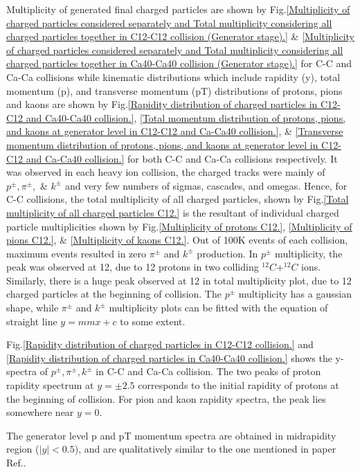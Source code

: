\documentclass[12pt, twocolumn]{article}
\begin{document}
Multiplicity of generated final charged particles are shown by Fig.\ref{Multiplicity of charged particles considered separately and Total multiplicity considering all charged particles together in C12-C12 collision (Generator stage).} \& \ref{Multiplicity of charged particles considered separately and Total multiplicity considering all charged particles together in Ca40-Ca40 collision (Generator stage).} for C-C and Ca-Ca  collisions while kinematic distributions which include rapidity (y), total momentum (p), and transverse momentum (pT) distributions of protons, pions and kaons are shown by Fig.\ref{Rapidity distribution of charged particles in C12-C12 and Ca40-Ca40 collision.}, \ref{Total momentum distribution of protons, pions, and kaons at generator level in C12-C12 and Ca-Ca40 collision.}, \& \ref{Transverse momentum distribution of protons, pions, and kaons at generator level in C12-C12 and Ca-Ca40 collision.} for both C-C and Ca-Ca  collisions respectively. It was observed in each heavy ion collision, the charged tracks were mainly of $p^{\pm}, \pi^{\pm},$ \& $k^{\pm}$ and very few numbers of sigmas, cascades, and omegas. Hence, for C-C collisions, the total multiplicity of all charged particles, shown by Fig.\ref{Total multiplicity of all charged particles C12.} is the resultant of individual charged particle multiplicities shown by Fig.\ref{Multiplicity of protons C12.}, \ref{Multiplicity of pions C12.}, \& \ref{Multiplicity of kaons C12.}. Out of 100K events of each collision, maximum events resulted in zero $\pi^{\pm}$ and $k^{\pm}$ production. In $p^{\pm}$ multiplicity, the peak was observed at 12, due to 12 protons in two colliding $^{12}C$+$^{12}C$ ions. Similarly, there is a huge peak observed at 12 in total multiplicity plot, due to 12 charged particles at the beginning of collision. The $p^{\pm}$ multiplicity has a gaussian shape, while $\pi^{\pm}$ and $k^{\pm}$ multiplicity plots can be fitted with the equation of straight line $y=mmx+c$ to some extent. 

Fig.\ref{Rapidity distribution of charged particles in C12-C12 collision.} and \ref{Rapidity distribution of charged particles in Ca40-Ca40 collision.} shows the y-spectra of $p^{\pm}, \pi^{\pm}, k^{\pm}$ in C-C and Ca-Ca collision. The two peaks of proton rapidity spectrum at $y=\pm2.5$ corresponds to the initial rapidity of protons at the beginning of collision. For pion and kaon rapidity spectra, the peak lies somewhere near $y=0$.

The generator level p and pT momentum spectra are obtained in midrapidity region ($|y|<0.5$), and are qualitatively similar to the one mentioned in paper Ref.\cite{abramov2021possible}.
\end{document}
